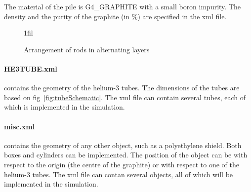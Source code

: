 \documentclass{article}
\makeatletter
\newcommand*{\centerfloat}{%
  \parindent \z@
  \leftskip \z@ \@plus 1fil \@minus \textwidth
  \rightskip\leftskip
  \parfillskip \z@skip}
\makeatother
\begin{document}
	The material of the pile is G4\_GRAPHITE with a small boron impurity. The density and the purity of the graphite (in \%) are specified in the xml file.


\begin{figure}[hbt]
	\centerfloat
	\caption{Arrangement of rods in alternating layers}	
	\label{fig:layers}
\end{figure}


	\paragraph{HE3TUBE.xml} contains the geometry of the helium-3 tubes. The dimensions of the tubes are based on fig~\ref{fig:tubeSchematic}. The xml file can contain several tubes, each of which is implemented in the simulation.



	\paragraph{misc.xml} contains the geometry of any other object, such as a polyethylene shield. Both boxes and cylinders can be implemented. The position of the object can be with respect to the origin (the centre of the graphite) or with respect to one of the helium-3 tubes. The xml file can contan several objects, all of which will be implemented in the simulation.
\end{document}
